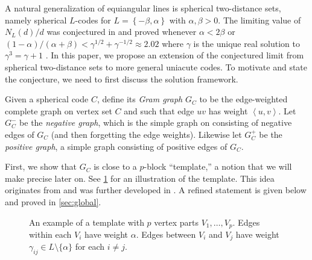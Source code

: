 \documentclass[reqno, 11pt]{amsart}
\theoremstyle{definition}
\theoremstyle{remark}
\newcommand{\ang}[1]{\left\langle #1 \right\rangle}
\newcommand{\set}[1]{\left\{ #1 \right\}}
\begin{document}
A natural generalization of equiangular lines is spherical two-distance sets, namely spherical $L$-codes for $L = \set{-\beta,\alpha}$ with $\alpha,\beta > 0$. 
The limiting value of $N_L(d)/d$ was conjectured in \cite{JTYZZ23} and proved whenever $\alpha < 2\beta$ or $(1-\alpha)/(\alpha+\beta) < \gamma^{1/2} + \gamma^{-1/2} \approx 2.02$ where $\gamma$ is the unique real solution to $\gamma^3 = \gamma + 1$ \cite{JP21+,JTYZZ23}.
In this paper, we propose an extension of the conjectured limit from spherical two-distance sets to more general uniacute codes. To motivate and state the conjecture, we need to first discuss the solution framework.

Given a spherical code $C$, define its \emph{Gram graph} $G_C$ to be the edge-weighted complete graph on vertex set $C$ and such that edge $uv$ has weight $\ang{u,v}$.
Let $G_C^-$ be the \emph{negative graph}, which is the simple graph on consisting of negative edges of $G_C$ (and then forgetting the edge weights).
Likewise let $G_C^+$ be the \emph{positive graph}, a simple graph consisting of positive edges of $G_C$.

First, we show that $G_C$ is close to a $p$-block ``template,'' a notion that we will make precise later on. See \cref{fig:template} for an illustration of the template.
This idea originates from \cite{BDKS18} and was further developed in \cite{JTYZZ21,JTYZZ23}. 
A refined statement is given below and proved in \cref{sec:global}.


\begin{figure}[h]

\caption{An example of a template with $p$ vertex parts $V_1, \dots, V_p$. Edges within each $V_i$ have weight $\alpha$. Edges between $V_i$ and $V_j$ have weight $\gamma_{ij} \in L \setminus \{\alpha\}$ for each $i \ne j$.} \label{fig:template}
\end{figure}
\end{document}
